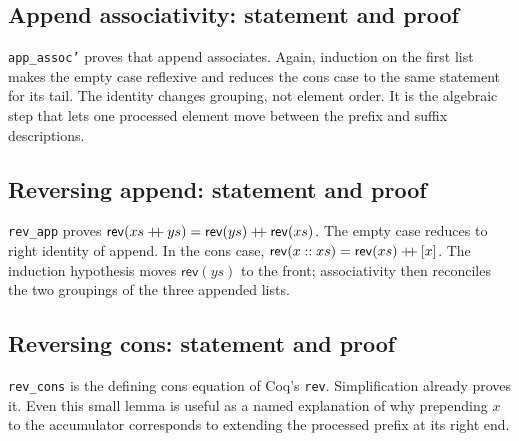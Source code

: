 \documentclass[11pt]{article}
\begin{document}
\subsection{Append associativity: statement and proof}

\begin{minipage}{\linewidth}

\end{minipage}

\texttt{app\_assoc'} proves that append associates. Again, induction on the
first list makes the empty case reflexive and reduces the cons case to the
same statement for its tail. The identity changes grouping, not element order.
It is the algebraic step that lets one processed element move between the
prefix and suffix descriptions.

\subsection{Reversing append: statement and proof}

\begin{minipage}{\linewidth}

\end{minipage}

\texttt{rev\_app} proves
\(\mathsf{rev}(xs\mathbin{+\mkern-6mu+}ys)=
\mathsf{rev}(ys)\mathbin{+\mkern-6mu+}\mathsf{rev}(xs)\).
The empty case reduces to right identity of append. In the cons case,
\(\mathsf{rev}(x::xs)=\mathsf{rev}(xs)\mathbin{+\mkern-6mu+}[x]\).
The induction hypothesis moves \(\mathsf{rev}(ys)\) to the front; associativity
then reconciles the two groupings of the three appended lists.

\subsection{Reversing cons: statement and proof}

\begin{minipage}{\linewidth}

\end{minipage}

\texttt{rev\_cons} is the defining cons equation of Coq's \texttt{rev}.
Simplification already proves it. Even this small lemma is useful as a named
explanation of why prepending \(x\) to the accumulator corresponds to extending
the processed prefix at its right end.
\end{document}
